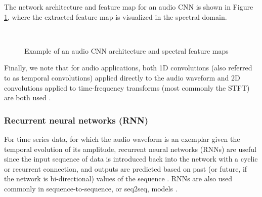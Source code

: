 \documentclass[report.tex]{subfiles}
\begin{document}
The network architecture and feature map for an audio CNN is shown in Figure \ref{fig:audiocnn}, where the extracted feature map is visualized in the spectral domain.

\begin{figure}[ht]
	\centering
	\\
	\caption{Example of an audio CNN architecture and spectral feature maps}
	\label{fig:audiocnn}
\end{figure}

Finally, we note that for audio applications, both 1D convolutions (also referred to as temporal convolutions) applied directly to the audio waveform and 2D convolutions applied to time-frequency transforms (most commonly the STFT) are both used \parencite{tcn, 2dconv}.

\subsubsection{Recurrent neural networks (RNN)}

For time series data, for which the audio waveform is an exemplar given the temporal evolution of its amplitude, recurrent neural networks (RNNs) are useful since the input sequence of data is introduced back into the network with a cyclic or recurrent connection, and outputs are predicted based on past (or future, if the network is bi-directional) values of the sequence \parencite{rnns}. RNNs are also used commonly in sequence-to-sequence, or seq2seq, models \parencite{seq2seqs}.
\end{document}
